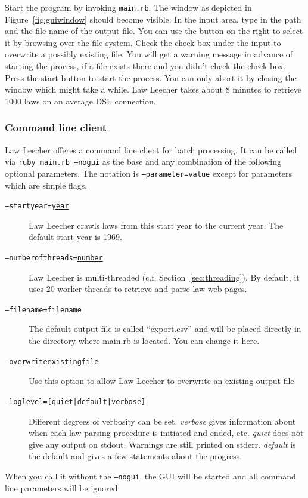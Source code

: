 \documentclass{scrartcl}
\begin{document}
Start the program by invoking \texttt{main.rb}. The window as depicted in Figure~\ref{fig:guiwindow} should become visible. In the input area, type in the path and the file name of the output file. You can use the button on the right to select it by browsing over the file system. Check the check box under the input to overwrite a possibly existing file. You will get a warning message in advance of starting the process, if a file exists there and you didn't check the check box. Press the start button to start the process. You can only abort it by closing the window which might take a while. Law Leecher takes about 8 minutes to retrieve 1000 laws on an average DSL connection.

\subsubsection{Command line client}
Law Leecher offeres a command line client for batch processing. It can be called via \texttt{ruby main.rb ---nogui} as the base and any combination of the following optional parameters. The notation is \texttt{---parameter=value} except for parameters which are simple flags.
\begin{description}
\item[\texttt{---startyear=\underline{year}}] Law Leecher crawls laws from this start year to the current year. The default start year is 1969.
\item[\texttt{---numberofthreads=\underline{number}}] Law Leecher is multi-threaded (c.f. Section~\ref{sec:threading}). By default, it uses 20 worker threads to retrieve and parse law web pages.
\item[\texttt{---filename=\underline{filename}}] The default output file is called ``export.csv'' and will be placed directly in the directory where main.rb is located. You can change it here.
\item[\texttt{---overwriteexistingfile}] Use this option to allow Law Leecher to overwrite an existing output file.
\item[\texttt{---loglevel=[quiet|default|verbose]}] Different degrees of verbosity can be set. \textit{verbose} gives information about when each law parsing procedure is initiated and ended, etc. \textit{quiet} does not give any output on stdout. Warnings are still printed on stderr. \textit{default} is the default and gives a few statements about the progress.
\end{description}

When you call it without the \texttt{---nogui}, the GUI will be started and all command line parameters will be ignored.
\end{document}
